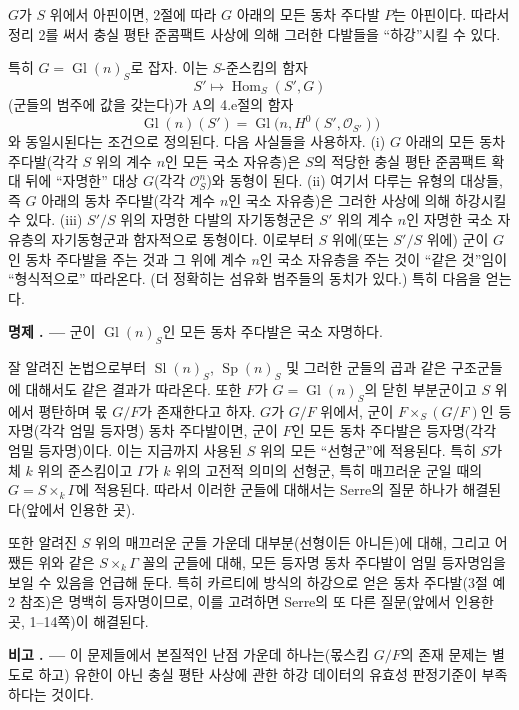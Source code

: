 \documentclass[11pt,twoside,openany]{book}
\numberwithin{equation}{section}
\newcommand{\sourceunit}{front}
\newcommand{\src}[1]{%
  \phantomsection\hypertarget{src:\sourceunit:#1}{}%
  \marginpar{\raggedleft\footnotesize\sffamily #1}%
}
\theoremstyle{plain}
\theoremstyle{definition}
\theoremstyle{remark}
\newcommand{\result}[2]{%
  \par\medskip\noindent\textbf{#1%
  \if\relax\detokenize{#2}\relax\else\space#2\fi. ---}\enspace
}
\begin{document}
$G$가 $S$ 위에서 아핀이면, 2절에 따라 $G$ 아래의 모든 동차 주다발
$P$는 아핀이다. 따라서 정리 2를 써서 충실 평탄 준콤팩트 사상에 의해
그러한 다발들을 ``하강''시킬 수 있다.

\src{326}
특히 $G=\operatorname{Gl}(n)_S$로 잡자. 이는 $S$-준스킴의 함자
\[
  S'\longmapsto\operatorname{Hom}_S(S',G)
\]
(군들의 범주에 값을 갖는다)가 A의 4.e절의 함자
\[
  \operatorname{Gl}(n)(S')
  =\operatorname{Gl}\bigl(n,H^0(S',\mathcal O_{S'})\bigr)
\]
와 동일시된다는 조건으로 정의된다. 다음 사실들을 사용하자. (i) $G$
아래의 모든 동차 주다발(각각 $S$ 위의 계수 $n$인 모든 국소 자유층)은
$S$의 적당한 충실 평탄 준콤팩트 확대 뒤에 ``자명한'' 대상 $G$(각각
$\mathcal O_S^n$)와 동형이 된다. (ii) 여기서 다루는 유형의 대상들,
즉 $G$ 아래의 동차 주다발(각각 계수 $n$인 국소 자유층)은 그러한
사상에 의해 하강시킬 수 있다. (iii) $S'/S$ 위의 자명한 다발의
자기동형군은 $S'$ 위의 계수 $n$인 자명한 국소 자유층의 자기동형군과
함자적으로 동형이다. 이로부터 $S$ 위에(또는 $S'/S$ 위에) 군이 $G$인
동차 주다발을 주는 것과 그 위에 계수 $n$인 국소 자유층을 주는 것이
``같은 것''임이 ``형식적으로'' 따라온다. (더 정확히는 섬유화 범주들의
동치가 있다.) 특히 다음을 얻는다.

\result{명제}{6.1} 군이 $\operatorname{Gl}(n)_S$인 모든 동차 주다발은
국소 자명하다.

잘 알려진 논법으로부터 $\operatorname{Sl}(n)_S$,
$\operatorname{Sp}(n)_S$ 및 그러한 군들의 곱과 같은 구조군들에 대해서도
같은 결과가 따라온다. 또한 $F$가 $G=\operatorname{Gl}(n)_S$의 닫힌
부분군이고 $S$ 위에서 평탄하며 몫 $G/F$가 존재한다고 하자. $G$가
$G/F$ 위에서, 군이 $F\times_S(G/F)$인 등자명(각각 엄밀 등자명) 동차
주다발이면, 군이 $F$인 모든 동차 주다발은 등자명(각각 엄밀 등자명)이다.
이는 지금까지 사용된 $S$ 위의 모든 ``선형군''에 적용된다. 특히 $S$가
체 $k$ 위의 준스킴이고 $\Gamma$가 $k$ 위의 고전적 의미의 선형군,
특히 매끄러운 군일 때의 $G=S\times_k\Gamma$에 적용된다. 따라서 이러한
군들에 대해서는 Serre의 질문 하나가 해결된다(앞에서 인용한 곳).

또한 알려진 $S$ 위의 매끄러운 군들 가운데 대부분(선형이든 아니든)에
대해, 그리고 어쨌든 위와 같은 $S\times_k\Gamma$ 꼴의 군들에 대해,
모든 등자명 동차 주다발이 엄밀 등자명임을 보일 수 있음을 언급해 둔다.
특히 카르티에 방식의 하강으로 얻은 동차 주다발(3절 예 2 참조)은 명백히
등자명이므로, 이를 고려하면 Serre의 또 다른 질문(앞에서 인용한 곳,
1--14쪽)이 해결된다.

\result{비고}{} 이 문제들에서 본질적인 난점 가운데 하나는(몫스킴
$G/F$의 존재 문제는 별도로 하고) 유한이 아닌 충실 평탄 사상에 관한
하강 데이터의 유효성 판정기준이 부족하다는 것이다.
\end{document}
